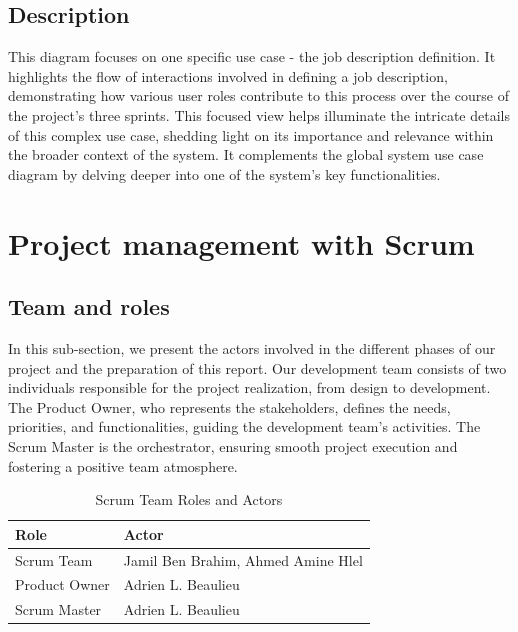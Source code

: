 \subsection*{Description}
This diagram focuses on one specific use case - the job description definition. It highlights the flow of interactions involved in defining a job description, demonstrating how various user roles contribute to this process over the course of the project's three sprints. This focused view helps illuminate the intricate details of this complex use case, shedding light on its importance and relevance within the broader context of the system. It complements the global system use case diagram by delving deeper into one of the system's key functionalities.

\section{Project management with Scrum}
\subsection{Team and roles}
In this sub-section, we present the actors involved in the different phases of our project and the preparation of this report. Our development team consists of two individuals responsible for the project realization, from design to development. The Product Owner, who represents the stakeholders, defines the needs, priorities, and functionalities, guiding the development team's activities. The Scrum Master is the orchestrator, ensuring smooth project execution and fostering a positive team atmosphere.

\begin{table}[H]
    \renewcommand{\arraystretch}{1.5}%
    \caption{Scrum Team Roles and Actors}
    \centering
    \medskip
    \begin{tabularx}{\textwidth} {
            | >{\hsize=0.5\hsize\raggedright\arraybackslash}X
            | >{\hsize=1.5\hsize\raggedright\arraybackslash}X |}
        \hline
        \rowcolor{primary} \textbf {Role} & \textbf {Actor}                    \\
        \hline
        Scrum Team                        & Jamil Ben Brahim, Ahmed Amine Hlel \\
        \hline
        Product Owner                     & Adrien L. Beaulieu                 \\
        \hline
        Scrum Master                      & Adrien L. Beaulieu                 \\
        \hline
    \end{tabularx}
\end{table}


